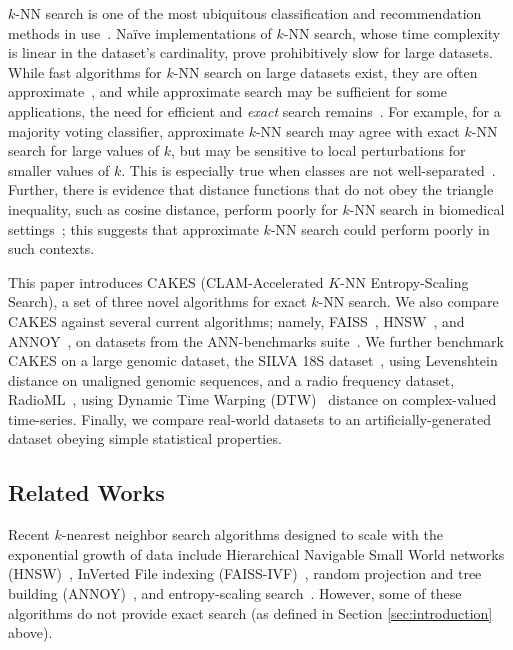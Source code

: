 $k$-NN search is one of the most ubiquitous classification and recommendation methods in use~\cite{fix1952discriminatory, cover1967nearest}.
Na\"{i}ve implementations of $k$-NN search, whose time complexity is linear in the dataset's cardinality, prove prohibitively slow for large datasets.
While fast algorithms for $k$-NN search on large datasets exist, they are often approximate~\cite{gao2023high}, and while approximate search may be sufficient for some applications, the need for efficient and \textit{exact} search remains~\cite{ukey2023survey}.
For example, for a majority voting classifier, approximate $k$-NN search may agree with exact $k$-NN search for large values of $k$, but may be sensitive to local perturbations for smaller values of $k$.
This is especially true when classes are not well-separated~\cite{zhang2022imbalanced}.
Further, there is evidence that distance functions that do not obey the triangle inequality, such as cosine distance, perform poorly for $k$-NN search in biomedical settings~\cite{hu2016distance};
this suggests that approximate $k$-NN search could perform poorly in such contexts.

This paper introduces CAKES (CLAM-Accelerated $K$-NN Entropy-Scaling Search), a set of three novel algorithms for exact $k$-NN search.
We also compare CAKES against several current algorithms; namely, FAISS~\cite{johnson2019billion}, HNSW~\cite{malkov2016hnsw}, and ANNOY~\cite{annoy}, on datasets from the ANN-benchmarks suite~\cite{aumuller2020ann}.
We further benchmark CAKES on a large genomic dataset, the SILVA 18S dataset~\cite{10.1093/nar/gks1219}, using Levenshtein~\cite{levenshtein1966binary} distance on unaligned genomic sequences, and a radio frequency dataset, RadioML~\cite{oshea2018radioml}, using Dynamic Time Warping (DTW)~\cite{gold2018dynamic} distance on complex-valued time-series.
Finally, we compare real-world datasets to an artificially-generated dataset obeying simple statistical properties.


\subsection{Related Works}
\label{sec:intoduction:related-works}

Recent $k$-nearest neighbor search algorithms designed to scale with the exponential growth of data include Hierarchical Navigable Small World networks (HNSW)~\cite{malkov2016hnsw}, InVerted File indexing (FAISS-IVF)~\cite{faissivf}, random projection and tree building (ANNOY)~\cite{annoy}, and entropy-scaling search~\cite{yu2015entropy, ishaq2019clustered}. However, some of these algorithms do not provide exact search (as defined in Section \ref{sec:introduction} above).


